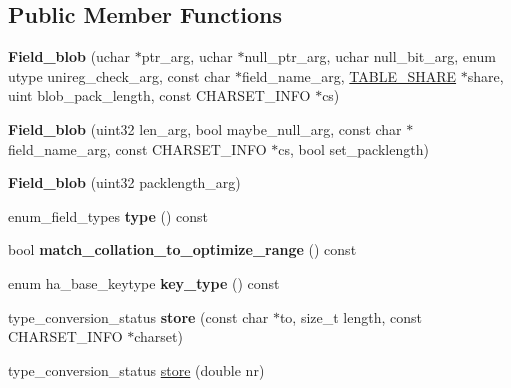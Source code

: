 \subsection*{Public Member Functions}
\begin{DoxyCompactItemize}
\item 
\mbox{\label{classField__blob_a937e20d88e5902ebf4948ba7c68f7cc5}} 
{\bfseries Field\+\_\+blob} (uchar $\ast$ptr\+\_\+arg, uchar $\ast$null\+\_\+ptr\+\_\+arg, uchar null\+\_\+bit\+\_\+arg, enum utype unireg\+\_\+check\+\_\+arg, const char $\ast$field\+\_\+name\+\_\+arg, \mbox{\hyperlink{structTABLE__SHARE}{T\+A\+B\+L\+E\+\_\+\+S\+H\+A\+RE}} $\ast$share, uint blob\+\_\+pack\+\_\+length, const C\+H\+A\+R\+S\+E\+T\+\_\+\+I\+N\+FO $\ast$cs)
\item 
\mbox{\label{classField__blob_a76266e5ea1ad5a589c5dd006a3a84d3c}} 
{\bfseries Field\+\_\+blob} (uint32 len\+\_\+arg, bool maybe\+\_\+null\+\_\+arg, const char $\ast$field\+\_\+name\+\_\+arg, const C\+H\+A\+R\+S\+E\+T\+\_\+\+I\+N\+FO $\ast$cs, bool set\+\_\+packlength)
\item 
\mbox{\label{classField__blob_a0d7d36f899d34c51b16928cf273c2078}} 
{\bfseries Field\+\_\+blob} (uint32 packlength\+\_\+arg)
\item 
\mbox{\label{classField__blob_a95224a0633a129a1c27c0e6cf0b8e4b3}} 
enum\+\_\+field\+\_\+types {\bfseries type} () const
\item 
\mbox{\label{classField__blob_ae0e9ff97d4332620f101c5e4f3588d91}} 
bool {\bfseries match\+\_\+collation\+\_\+to\+\_\+optimize\+\_\+range} () const
\item 
\mbox{\label{classField__blob_a0f8890100265bc7adb32c8de5811079d}} 
enum ha\+\_\+base\+\_\+keytype {\bfseries key\+\_\+type} () const
\item 
\mbox{\label{classField__blob_a8a52e2ffe708bc6e95114d4159c3a671}} 
type\+\_\+conversion\+\_\+status {\bfseries store} (const char $\ast$to, size\+\_\+t length, const C\+H\+A\+R\+S\+E\+T\+\_\+\+I\+N\+FO $\ast$charset)
\item 
type\+\_\+conversion\+\_\+status \mbox{\hyperlink{classField__blob_a2bc7bea5075f5ebbee1a11c13e37b5b2}{store}} (double nr)

\end{DoxyCompactItemize}
